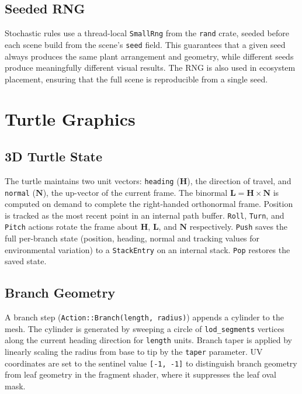 \subsection{Seeded RNG}

Stochastic rules use a thread-local \texttt{SmallRng} from the \texttt{rand} crate, seeded before each scene
build from the scene's \texttt{seed} field. This guarantees that a given seed always produces the same plant
arrangement and geometry, while different seeds produce meaningfully different visual results. The RNG is
also used in ecosystem placement, ensuring that the full scene is reproducible from a single seed.

\section{Turtle Graphics}
\label{sec:turtle}

\subsection{3D Turtle State}

The turtle maintains two unit vectors: \texttt{heading} ($\mathbf{H}$), the direction of travel, and
\texttt{normal} ($\mathbf{N}$), the up-vector of the current frame. The binormal $\mathbf{L} = \mathbf{H}
\times \mathbf{N}$ is computed on demand to complete the right-handed orthonormal frame. Position is tracked
as the most recent point in an internal path buffer. \texttt{Roll}, \texttt{Turn}, and \texttt{Pitch} actions
rotate the frame about $\mathbf{H}$, $\mathbf{L}$, and $\mathbf{N}$ respectively. \texttt{Push} saves the
full per-branch state (position, heading, normal and tracking values for environmental variation) to a
\texttt{StackEntry} on an internal stack. \texttt{Pop} restores the saved state.

\subsection{Branch Geometry}

A branch step (\texttt{Action::Branch(length, radius)}) appends a cylinder to the mesh. The cylinder is
generated by sweeping a circle of \texttt{lod\_segments} vertices along the current heading direction for
\texttt{length} units. Branch taper is applied by linearly scaling the radius from base to tip by the
\texttt{taper} parameter. UV coordinates are set to the sentinel value \texttt{[-1, -1]} to distinguish
branch geometry from leaf geometry in the fragment shader, where it suppresses the leaf oval mask.

